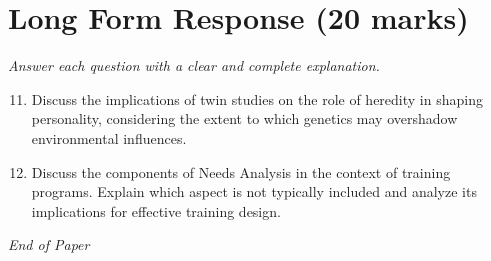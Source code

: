 \documentclass[12pt]{article}
\begin{document}
\section*{Long Form Response (20 marks)}
\textit{Answer each question with a clear and complete explanation.}
\begin{enumerate}[label=\arabic*.]
\setcounter{enumi}{10}
\item Discuss the implications of twin studies on the role of heredity in shaping personality, considering the extent to which genetics may overshadow environmental influences.
\item Discuss the components of Needs Analysis in the context of training programs. Explain which aspect is not typically included and analyze its implications for effective training design.
\end{enumerate}

\vfill
\noindent\textit{End of Paper}
\end{document}
